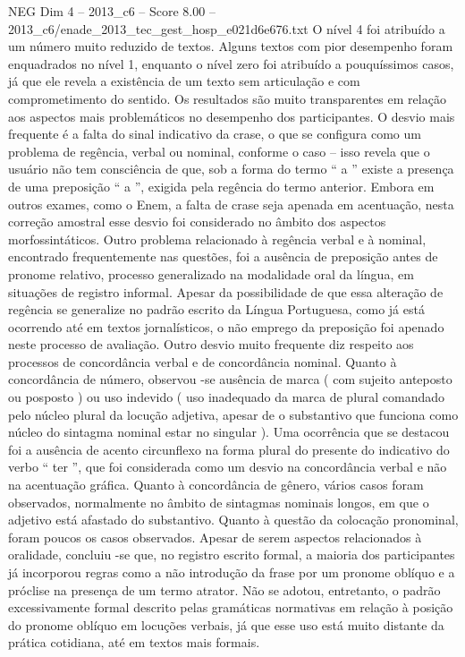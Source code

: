 \begin{textsample}{NEG Dim 4 – 2013\_c6 – Score 8.00 – 2013\_c6/enade\_2013\_tec\_gest\_hosp\_e021d6e676.txt}
O nível 4 foi atribuído a um número muito reduzido de textos.
Alguns textos com pior desempenho foram enquadrados no nível 1, enquanto o nível zero foi atribuído a pouquíssimos casos, já que ele revela a existência de um texto sem articulação e com comprometimento do sentido.
Os resultados são muito transparentes em relação aos aspectos mais problemáticos no desempenho dos participantes.
O desvio mais frequente é a falta do sinal indicativo da crase, o que se configura como um problema de regência, verbal ou nominal, conforme o caso – isso revela que o usuário não tem consciência de que, sob a forma do termo “ a ” existe a presença de uma preposição “ a ”, exigida pela regência do termo anterior.
Embora em outros exames, como o Enem, a falta de crase seja apenada em acentuação, nesta correção amostral esse desvio foi considerado no âmbito dos aspectos morfossintáticos.
Outro problema relacionado à regência verbal e à nominal, encontrado frequentemente nas questões, foi a ausência de preposição antes de pronome relativo, processo generalizado na modalidade oral da língua, em situações de registro informal.
Apesar da possibilidade de que essa alteração de regência se generalize no padrão escrito da Língua Portuguesa, como já está ocorrendo até em textos jornalísticos, o não emprego da preposição foi apenado neste processo de avaliação.
Outro desvio muito frequente diz respeito aos processos de concordância verbal e de concordância nominal.
Quanto à concordância de número, observou -se ausência de marca ( com sujeito anteposto ou posposto ) ou uso indevido ( uso inadequado da marca de plural comandado pelo núcleo plural da locução adjetiva, apesar de o substantivo que funciona como núcleo do sintagma nominal estar no singular ).
Uma ocorrência que se destacou foi a ausência de acento circunflexo na forma plural do presente do indicativo do verbo “ ter ”, que foi considerada como um desvio na concordância verbal e não na acentuação gráfica.
Quanto à concordância de gênero, vários casos foram observados, normalmente no âmbito de sintagmas nominais longos, em que o adjetivo está afastado do substantivo.
Quanto à questão da colocação pronominal, foram poucos os casos observados.
Apesar de serem aspectos relacionados à oralidade, concluiu -se que, no registro escrito formal, a maioria dos participantes já incorporou regras como a não introdução da frase por um pronome oblíquo e a próclise na presença de um termo atrator.
Não se adotou, entretanto, o padrão excessivamente formal descrito pelas gramáticas normativas em relação à posição do pronome oblíquo em locuções verbais, já que esse uso está muito distante da prática cotidiana, até em textos mais formais.

\end{textsample}

